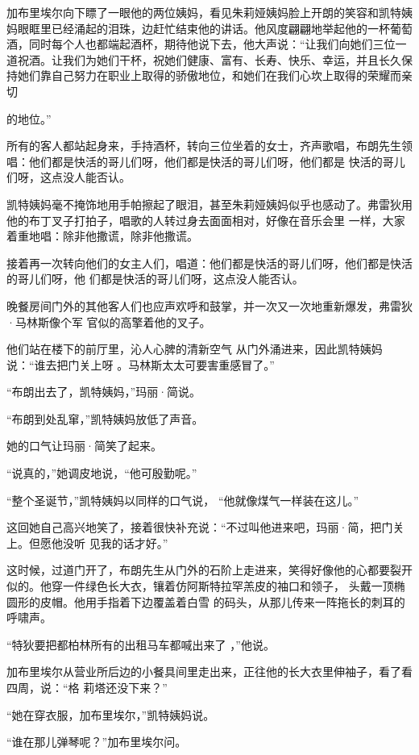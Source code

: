 \documentclass{article}
\begin{document}
加布里埃尔向下瞟了一眼他的两位姨妈，看见朱莉娅姨妈脸上开朗的笑容和凯特姨妈眼眶里已经涌起的泪珠，边赶忙结束他的讲话。他风度翩翩地举起他的一杯葡萄酒，同时每个人也都端起酒杯，期待他说下去，他大声说：“让我们向她们三位一道祝酒。让我们为她们干杯，祝她们健康、富有、长寿、快乐、幸运，并且长久保持她们靠自己努力在职业上取得的骄傲地位，和她们在我们心坎上取得的荣耀而亲切
\newpage

的地位。” 

所有的客人都站起身来，手持酒杯，转向三位坐着的女士，齐声歌唱，布朗先生领唱：他们都是快活的哥儿们呀，他们都是快活的哥儿们呀，他们都是
快活的哥儿们呀，这点没人能否认。 

凯特姨妈毫不掩饰地用手帕擦起了眼泪，甚至朱莉娅姨妈似乎也感动了。弗雷狄用他的布丁叉子打拍子，唱歌的人转过身去面面相对，好像在音乐会里
一样，大家着重地唱：除非他撒谎，除非他撒谎。 

接着再一次转向他们的女主人们，唱道：他们都是快活的哥儿们呀，他们都是快活的哥儿们呀，他
们都是快活的哥儿们呀，这点没人能否认。 

晚餐房间门外的其他客人们也应声欢呼和鼓掌，并一次又一次地重新爆发，弗雷狄·马林斯像个军
官似的高擎着他的叉子。 

他们站在楼下的前厅里，沁人心脾的清新空气
\newpage
从门外涌进来，因此凯特姨妈说：“谁去把门关上呀
。马林斯太太可要害重感冒了。” 


“布朗出去了，凯特姨妈，”玛丽·简说。 


“布朗到处乱窜，”凯特姨妈放低了声音。 


她的口气让玛丽·简笑了起来。 

“说真的，”她调皮地说，“他可殷勤呢。”

“整个圣诞节，”凯特姨妈以同样的口气说，
“他就像煤气一样装在这儿。” 

这回她自己高兴地笑了，接着很快补充说：“不过叫他进来吧，玛丽·简，把门关上。但愿他没听
见我的话才好。” 

这时候，过道门开了，布朗先生从门外的石阶上走进来，笑得好像他的心都要裂开似的。他穿一件绿色长大衣，镶着仿阿斯特拉罕羔皮的袖口和领子，
\newpage
头戴一顶椭圆形的皮帽。他用手指着下边覆盖着白雪
的码头，从那儿传来一阵拖长的刺耳的呼啸声。 

“特狄要把都柏林所有的出租马车都喊出来了
，”他说。 

加布里埃尔从营业所后边的小餐具间里走出来，正往他的长大衣里伸袖子，看了看四周，说：“格
莉塔还没下来？” 

“她在穿衣服，加布里埃尔，”凯特姨妈说。


“谁在那儿弹琴呢？”加布里埃尔问。 
\end{document}
